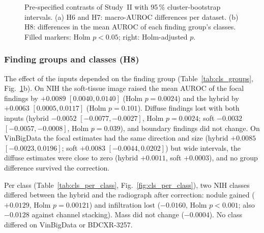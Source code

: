 \begin{table}[!t]
\centering
\caption{H6 (primary) and H7: differences of the seed ensembles with 95\,\% cluster-bootstrap intervals (\num{10000} resamples). Holm: H6
over the three datasets, H7 over its six tests.}
\label{tab:cls_primary}
\end{table}

\begin{figure}[!t]
\centering
{}
\caption{Pre-specified contrasts of Study~II with 95\,\% cluster-bootstrap intervals. (a) H6 and H7: macro-AUROC differences per dataset.
(b) H8: differences in the mean AUROC of each finding group's classes. Filled markers: Holm $p<0.05$; right: Holm-adjusted $p$.}
\label{fig:cls_forest}
\end{figure}

\subsubsection{Finding groups and classes (H8)}
The effect of the inputs depended on the finding group (Table~\ref{tab:cls_groups}, Fig.~\ref{fig:cls_forest}b). On NIH the soft-tissue
image raised the mean AUROC of the focal findings by $+0.0089$ $[0.0040,0.0140]$ (Holm $p=0.0024$) and the hybrid by $+0.0063$
$[0.0005,0.0117]$ (Holm $p=0.101$). Diffuse findings lost with both inputs (hybrid $-0.0052$ $[-0.0077,-0.0027]$, Holm $p=0.0024$; soft
$-0.0032$ $[-0.0057,-0.0008]$, Holm $p=0.039$), and boundary findings did not change. On VinBigData the focal estimates had the same
direction and size (hybrid $+0.0085$ $[-0.0023,0.0196]$; soft $+0.0083$ $[-0.0044,0.0202]$) but wide intervals, the diffuse estimates were
close to zero (hybrid $+0.0011$, soft $+0.0003$), and no group difference survived the correction.

\begin{table}[!t]
\centering
\caption{H8: difference in the mean per-class AUROC of each finding group, with 95\,\% cluster-bootstrap intervals; Holm within dataset
over groups and contrasts.}
\label{tab:cls_groups}
\end{table}

Per class (Table~\ref{tab:cls_per_class}, Fig.~\ref{fig:cls_per_class}), two NIH classes differed between the hybrid and the radiograph
after correction: nodule gained ($+0.0129$, Holm $p=0.00121$) and infiltration lost ($-0.0160$, Holm $p<0.001$; also $-0.0128$ against
channel stacking). Mass did not change ($-0.0004$). No class differed on VinBigData or BDCXR-3257.

